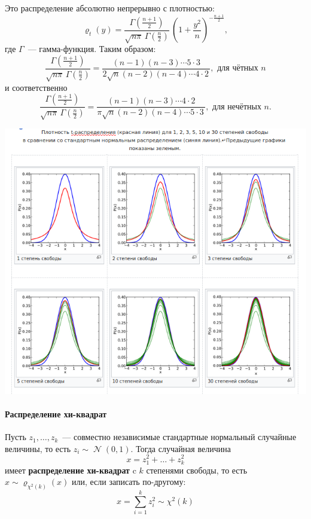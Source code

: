 \documentclass[12pt]{article}
\DeclareMathOperator{\Norm}{\mathcal{N}}
\begin{document}
    Это распределение абсолютно непрерывно с плотностью:
    \begin{equation*}
        \varrho_{t}(y)={\frac {\Gamma \left({\frac {n+1}{2}}\right)}{{\sqrt {n\pi }}\,\Gamma \left({\frac {n}{2}}\right)}}\,\left(1+{\frac {y^{2}}{n}}\right)^{-{\frac {n+1}{2}}},
    \end{equation*}
    где $\Gamma$~--- гамма-функция. Таким образом:
    \begin{equation*}
        \frac{\Gamma(\frac{ n+1}{2})} {\sqrt{ n\pi}\,\Gamma(\frac{ n}{2})} =  \frac{( n -1)( n -3)\cdots 5 \cdot 3} {2\sqrt{ n}( n -2)( n -4)\cdots 4 \cdot 2\,}, \text{ для чётных $n$}
    \end{equation*}
    и соответственно 
    \begin{equation*}
        {\frac {\Gamma ({\frac {n+1}{2}})}{{\sqrt {n\pi }}\,\Gamma ({\frac {n}{2}})}}={\frac {(n-1)(n-3)\cdots 4\cdot 2}{\pi {\sqrt {n}}(n-2)(n-4)\cdots 5\cdot 3\,}}, \text{ для нечётных $n$.}
    \end{equation*}
    \begin{center}
        \includegraphics[width=15cm]{student.png}
    \end{center}

    \paragraph{Распределение хи-квадрат} Пусть $z_1, \ldots, z_k$~--- совместно независимые стандартные нормальный случайные величины, то есть $z_i \sim \Norm(0, 1)$. Тогда случайная величина 
    \begin{equation*}
        x = z_1^2 + \ldots + z_k^2
    \end{equation*}
    имеет \textbf{распределение хи-квадрат} c $k$ степенями свободы, то есть $x \sim \varrho_{\chi^2(k)}(x)$ или, если записать по-другому:
    \begin{equation*}
        x = \sum\limits_{i=1}^k z_i^2 \sim \chi^2(k)
    \end{equation*}
\end{document}
